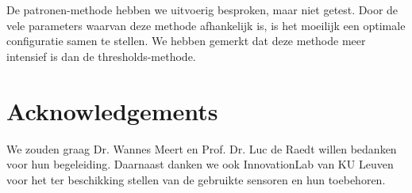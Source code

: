 \documentclass{article}
\begin{document}
De patronen-methode hebben we uitvoerig besproken, maar niet getest. Door de vele parameters waarvan deze methode afhankelijk is, is het moeilijk een optimale configuratie samen te stellen. We hebben gemerkt dat deze methode meer intensief is dan de thresholds-methode. 


\section*{Acknowledgements}
We zouden graag Dr. Wannes Meert en Prof. Dr. Luc de Raedt willen bedanken voor hun begeleiding. Daarnaast danken we ook InnovationLab van KU Leuven voor het ter beschikking stellen van de gebruikte sensoren en hun toebehoren.

\appendix



\end{document}
